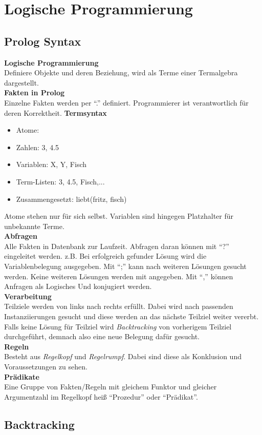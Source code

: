 

\section{Logische Programmierung}

\subsection{Prolog Syntax}
\textbf{Logische Programmierung}\\
Definiere Objekte und deren Beziehung, wird als Terme einer Termalgebra dargestellt.\\
\textbf{Fakten in Prolog}\\
Einzelne Fakten werden per \enquote{.} definiert.
Programmierer ist verantwortlich für deren Korrektheit.
\textbf{Termsyntax}
\begin{itemize}
  \item Atome: 
  \item Zahlen: 3, 4.5
  \item Variablen: X, Y, Fisch
  \item Term-Listen: 3, 4.5, Fisch,...
  \item Zusammengesetzt: liebt(fritz, fisch)
\end{itemize}
Atome stehen nur für sich selbst. Variablen sind hingegen Platzhalter für unbekannte Terme.\\
\textbf{Abfragen}\\
Alle Fakten in Datenbank zur Laufzeit. Abfragen daran können mit \enquote{?} eingeleitet werden.
z.B. 
Bei erfolgreich gefunder Lösung wird die Variablenbelegung ausgegeben. Mit \enquote{;} kann nach weiteren Lösungen
gesucht werden. Keine weiteren Lösungen werden mit  angegeben.
Mit \enquote{,} können Anfragen als Logisches Und konjugiert werden.\\
\textbf{Verarbeitung}\\
Teilziele werden von links nach rechts erfüllt. Dabei wird nach passenden Instanziierungen gesucht und diese werden
an das nächste Teilziel weiter vererbt. Falls keine Lösung für Teilziel wird \textit{Backtracking} von vorherigem Teilziel
durchgeführt, demnach also eine neue Belegung dafür gesucht.\\
\textbf{Regeln}\\
Besteht aus \textit{Regelkopf} und \textit{Regelrumpf}. Dabei sind diese als Konklusion und Voraussetzungen zu sehen.
\\
\textbf{Prädikate}\\
Eine Gruppe von Fakten/Regeln mit gleichem Funktor und gleicher Argumentzahl im Regelkopf heiß \enquote{Prozedur}
oder \enquote{Prädikat}.

\subsection{Backtracking}
